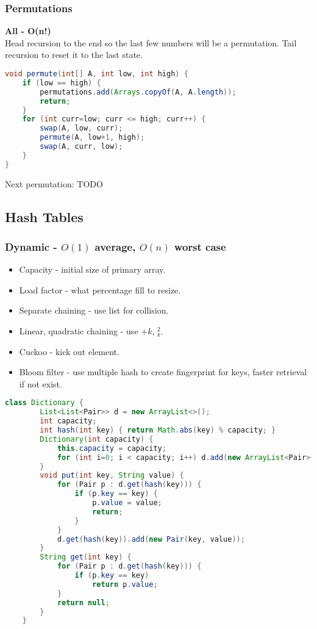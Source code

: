 \documentclass[10pt]{article}
\begin{document}
\subsubsection{Permutations}
\textbf{All - O(n!)}\\
Head recursion to the end so the last few numbers will be a permutation. Tail recursion to reset it to the last state.
\begin{lstlisting}[language=java]
void permute(int[] A, int low, int high) {
    if (low == high) {
        permutations.add(Arrays.copyOf(A, A.length));
        return;
    }
    for (int curr=low; curr <= high; curr++) {
        swap(A, low, curr);
        permute(A, low+1, high);
        swap(A, curr, low);
    }
}
\end{lstlisting}
Next permutation: TODO

\subsection{Hash Tables}
\subsubsection{Dynamic - $O(1)$ average, $O(n)$ worst case}
\begin{itemize}
    \item Capacity - initial size of primary array.
    \item Load factor - what percentage fill to resize.
    \item Separate chaining - use list for collision.
    \item Linear, quadratic chaining - use $+k$, $_k^2$.
    \item Cuckoo - kick out element.
    \item Bloom filter - use multiple hash to create fingerprint for keys, faster retrieval if not exist.
\end{itemize}
\begin{lstlisting}[language=java]
    class Dictionary {
        List<List<Pair>> d = new ArrayList<>();
        int capacity;
        int hash(int key) { return Math.abs(key) % capacity; }
        Dictionary(int capacity) {
            this.capacity = capacity;
            for (int i=0; i < capacity; i++) d.add(new ArrayList<Pair>());
        }
        void put(int key, String value) {
            for (Pair p : d.get(hash(key))) {
                if (p.key == key) {
                    p.value = value;
                    return;
                }
            }
            d.get(hash(key)).add(new Pair(key, value));
        }
        String get(int key) {
            for (Pair p : d.get(hash(key))) {
                if (p.key == key)
                    return p.value;
            }
            return null;
        }
    }
\end{lstlisting}
\end{document}
